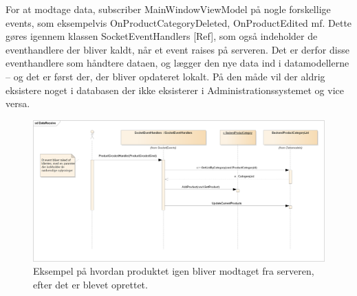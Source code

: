 For at modtage data, subscriber MainWindowViewModel på nogle forskellige events, som eksempelvis OnProductCategoryDeleted, OnProductEdited mf. Dette gøres igennem klassen SocketEventHandlers [Ref], som også indeholder de eventhandlere der bliver kaldt, når et event raises på serveren.  Det er derfor disse eventhandlere som håndtere dataen, og lægger den nye data ind i datamodellerne – og det er først der, der bliver opdateret lokalt. På den måde vil der aldrig eksistere noget i databasen der ikke eksisterer i Administrationssystemet og vice versa. 
\begin{figure}[!h]
    \centering
    \includegraphics[width=1\textwidth]{Systemdesign/backend/Images/DataReceive.png}
    \caption{Eksempel på hvordan produktet igen bliver modtaget fra serveren, efter det er blevet oprettet.}
    \label{fig:DataReceive}
\end{figure}


